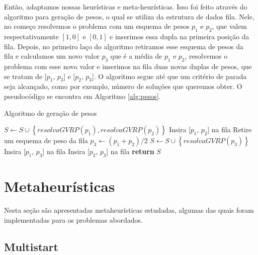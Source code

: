 \documentclass[12pt, a4paper]{article}
\begin{document}
Então, adaptamos nossas heurísticas e meta-heurísticas. Isso foi feito através do algoritmo para geração de pesos, o qual se utiliza da estrutura de dados fila. Nele, no começo resolvemos o problema com um esquema de pesos $p_1$ e $p_2$, que valem respectativamente $[1, 0]$ e $[0, 1]$ e inserimos essa dupla na primeira posição da fila. Depois, no primeiro laço do algoritmo retiramos esse esquema de pesos da fila e calculamos um novo valor $p_3$ que é a média de $p_1$ e $p_2$, resolvemos o problema com esse novo valor e inserimos na fila duas novas duplas de pesos, que se tratam de [$p_1$, $p_3$] e [$p_2$, $p_3$]. O algoritmo segue até que um critério de parada seja alcançado, como por exemplo, número de soluções que queremos obter.  O pseudocódigo se encontra em Algoritmo \ref{alg:pesos}.
%
\begin{algorithm}[htb!]
  \caption{Algoritmo de geração de pesos}\label{alg:pesos}
  \begin{algorithmic}[1]
	\State $S \gets S \cup \left\{resolvaGVRP(p_1), resolvaGVRP(p_2)\right\}$
	\State Insira [$p_1$, $p_2$] na fila
       	\State Retire um esquema de peso da fila
	\State $p_3 \gets (p_1 + p_2) / 2$
	\State $S \gets S \cup \left\{resolvaGVRP(p_3)\right\}$
	\State Insira [$p_1$, $p_3$] na fila
	\State Insira [$p_2$, $p_3$] na fila
       \EndWhile
      \State \textbf{return} $S$
    \EndFunction
  \end{algorithmic}
\end{algorithm}


\section{Metaheurísticas}\label{sec:metaheuristics}

Nesta seção são apresentadas metaheurísticas estudadas, algumas das quais foram implementadas para os problemas abordados.

\subsection{Multistart}
\end{document}
